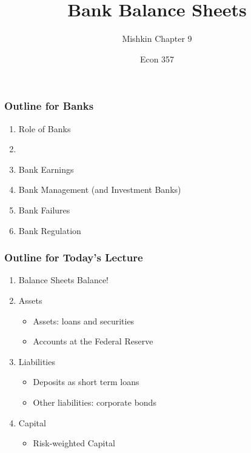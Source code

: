 \documentclass{beamer}
\title{Bank Balance Sheets}
\subtitle{Mishkin Chapter 9}
\author{Econ 357}
\date{\week}
\begin{document}
\frame{\titlepage}

\begin{frame}
    \frametitle{Outline for Banks}
        \begin{enumerate}
            \item Role of Banks
            \item {}
            \item Bank Earnings
            \item Bank Management (and Investment Banks)
            \item Bank Failures
            \item Bank Regulation
        \end{enumerate}
\end{frame}


\begin{frame}
    \frametitle{Outline for Today's Lecture}
    
    \begin{enumerate}
        \item Balance Sheets Balance!
        \item Assets
        \begin{itemize}
        \item Assets: loans and securities
        \item Accounts at the Federal Reserve
        \end{itemize}
        \item Liabilities
        \begin{itemize}
            \item Deposits as short term loans
            \item Other liabilities: corporate bonds
        \end{itemize}
        \item Capital
        \begin{itemize}
            \item Risk-weighted Capital
        \end{itemize}
    \end{enumerate}

\end{frame}
\end{document}
